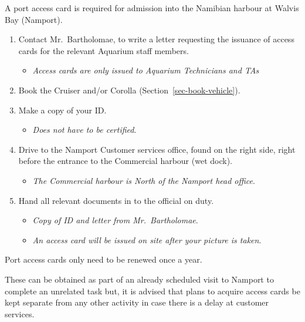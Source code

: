 \documentclass[
  letterpaper,
  DIV=11,
  numbers=noendperiod]{scrreprt}
\providecommand{\tightlist}{%
  \setlength{\itemsep}{0pt}\setlength{\parskip}{0pt}}\usepackage{longtable,booktabs,array}
\begin{document}
A port access card is required for admission into the Namibian harbour
at Walvis Bay (Namport).

\begin{enumerate}
\def\labelenumi{\arabic{enumi}.}
\tightlist
\item
  Contact Mr.~Bartholomae, to write a letter requesting the issuance of
  access cards for the relevant Aquarium staff members.

  \begin{itemize}
  \tightlist
  \item
    \emph{Access cards are only issued to Aquarium Technicians and TAs}
  \end{itemize}
\item
  Book the Cruiser and/or Corolla (Section~\ref{sec-book-vehicle}).
\item
  Make a copy of your ID.

  \begin{itemize}
  \tightlist
  \item
    \emph{Does not have to be certified}.
  \end{itemize}
\item
  Drive to the Namport Customer services office, found on the right
  side, right before the entrance to the Commercial harbour (wet dock).

  \begin{itemize}
  \tightlist
  \item
    \emph{The Commercial harbour is North of the Namport head office}.
  \end{itemize}
\item
  Hand all relevant documents in to the official on duty.

  \begin{itemize}
  \tightlist
  \item
    \emph{Copy of ID and letter from Mr.~Bartholomae}.
  \item
    \emph{An access card will be issued on site after your picture is
    taken}.
  \end{itemize}
\end{enumerate}

{Port access cards only need to be renewed once a year}.

These can be obtained as part of an already scheduled visit to Namport
to complete an unrelated task but, it is advised that plans to acquire
access cards be kept separate from any other activity in case there is a
delay at customer services.
\end{document}
